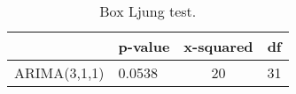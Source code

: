\begin{table}[ht]
\centering
\caption[Box Ljung test.]{Box Ljung test.} 
\label{tab:chp_ts:arima_res_rbox_l}
\begin{tabular}{llcc}
  \toprule  & p-value & x-squared & df \\ 
  \midrule ARIMA(3,1,1)                    & 0.0538 & 20 & 31 \\ 
   \bottomrule \end{tabular}
\end{table}
